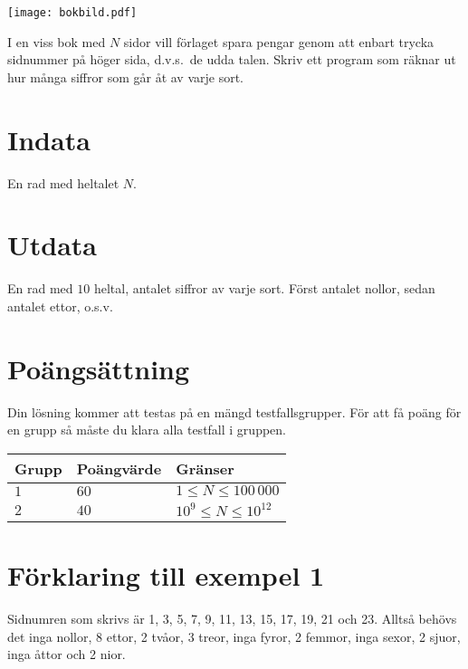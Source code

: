 
\begin{center}
\texttt{[image: bokbild.pdf]}
\end{center}
 
I en viss bok med $N$ sidor vill förlaget spara pengar genom att enbart trycka
sidnummer på höger sida, d.v.s.\ de udda talen. Skriv ett program som
räknar ut hur många siffror som går åt av varje sort.

\section*{Indata}
En rad med heltalet $N$.

\section*{Utdata}
En rad med $10$ heltal, antalet siffror av varje sort. Först antalet nollor, sedan antalet ettor, o.s.v.


\section*{Poängsättning}
Din lösning kommer att testas på en mängd testfallsgrupper.
För att få poäng för en grupp så måste du klara alla testfall i gruppen.

\noindent
\begin{tabular}{| l | l | l |}
\hline
  Grupp & Poängvärde & Gränser \\ \hline
  $1$    & $60$       &  $1 \le N \le 100\,000$   \\ \hline 
  $2$    & $40$       &  $10^{9} \le N \le 10^{12}$ \\ \hline
\end{tabular}


\section*{Förklaring till exempel 1}

Sidnumren som skrivs är 1, 3, 5, 7, 9, 11, 13, 15,
17, 19, 21 och 23. Alltså behövs det inga nollor, 8 ettor, 2 tvåor, 3
treor, inga fyror, 2 femmor, inga sexor, 2 sjuor, inga åttor och 2 nior.


